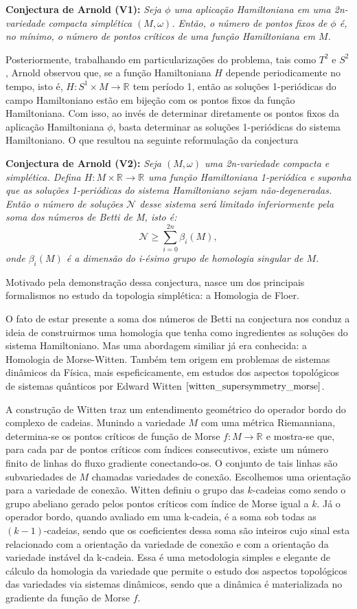 \documentclass[12pt]{book}
\newcommand{\circulo}{S^{1}}
\newcommand{\circulovariedade}{\circulo\times M}
\newcommand{\real}[1]{\mathbb{R}^{#1}}
\newcommand{\reta}{\real{}}
\begin{document}
	\textbf{Conjectura de Arnold (V1):} \textit{Seja $\phi$ uma aplicação Hamiltoniana em uma 2n-variedade compacta simplética $(M, \omega)$. Então, o número de pontos fixos de $\phi$ é, no mínimo, o número de pontos críticos de uma função Hamiltoniana em $M$.}
	
	Posteriormente, trabalhando em particularizações do problema, tais como $T^{2}$ e $S^{2}$, Arnold observou que, se a função Hamiltoniana $H$ depende periodicamente no tempo, isto é, $H:\circulovariedade\to \reta$ tem período 1, então as soluções 1-periódicas do campo Hamiltoniano estão em bijeção com os pontos fixos da função Hamiltoniana. Com isso, ao invés de determinar diretamente os pontos fixos da aplicação Hamiltoniana $\phi$, basta determinar as soluções 1-periódicas do sistema Hamiltoniano. O que resultou na seguinte reformulação da conjectura
	
	\textbf{Conjectura de Arnold (V2):} \textit	{Seja $(M,\omega)$ uma 2n-variedade compacta e simplética. Defina $H:M\times \real{} \to \reta$ uma função Hamiltoniana 1-periódica e suponha que as soluções 1-periódicas do sistema Hamiltoniano sejam não-degeneradas. Então o número de soluções $\mathcal{N}$ desse sistema será limitado inferiormente pela soma dos números de Betti de M, isto é:
		$$
		\mathcal{N}\geq \sum_{i=0}^{2n}\beta_{i}(M),
		$$
		onde $\beta_{i}(M)$ é a dimensão do i-ésimo grupo de homologia singular de $M$.}
	
	Motivado pela demonstração dessa conjectura, nasce um dos principais formalismos no estudo da topologia simplética: a Homologia de Floer.
	
	O fato de estar presente a soma dos números de Betti na conjectura nos conduz a ideia de construirmos uma homologia que tenha como ingredientes as soluções do sistema Hamiltoniano. Mas uma abordagem similiar já era conhecida: a Homologia de Morse-Witten. Também tem origem em problemas de sistemas dinâmicos da Física, mais espeficicamente, em estudos dos aspectos topológicos de sistemas quânticos por Edward Witten $\cite{witten_supersymmetry_morse}$.
	
	A construção de Witten traz um entendimento geométrico do operador bordo do complexo de cadeias. Munindo a variedade $M$ com uma métrica Riemanniana, determina-se os pontos críticos de função de Morse $f: M \to \reta$ e mostra-se que, para cada par de pontos críticos com índices consecutivos, existe um número finito de linhas do fluxo gradiente conectando-os. O conjunto de tais linhas são subvariedades de $M$ chamadas variedades de conexão. Escolhemos  uma orientação para a variedade de conexão. Witten definiu o grupo das $k$-cadeias como sendo o grupo abeliano gerado pelos pontos críticos com índice de Morse igual a $k$. Já o operador bordo, quando avaliado em uma k-cadeia, é a soma sob todas as $(k-1)$-cadeias, sendo que os coeficientes dessa soma são inteiros cujo sinal esta relacionado com a orientação da variedade de conexão e com a orientação da variedade instável da k-cadeia. Essa é uma metodologia simples e elegante de cálculo da homologia da variedade que permite o estudo dos aspectos topológicos das variedades via sistemas dinâmicos, sendo que a dinâmica é materializada no gradiente da função de Morse $f$.
	
\end{document}
